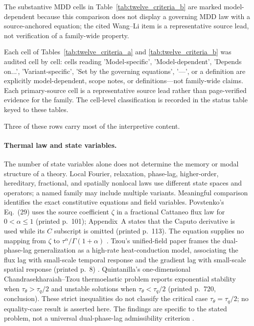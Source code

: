 The substantive MDD cells in Table~\ref{tab:twelve_criteria_b} are marked model-dependent because this comparison does not display a governing MDD law with a source-anchored equation; the cited Wang--Li item is a representative source lead, not verification of a family-wide property.

Each cell of Tables~\ref{tab:twelve_criteria_a} and \ref{tab:twelve_criteria_b} was audited cell by cell: cells reading 'Model-specific', 'Model-dependent', 'Depends on...', 'Variant-specific', 'Set by the governing equations', '---', or a definition are explicitly model-dependent, scope notes, or definitions---not family-wide claims. Each primary-source cell is a representative source lead rather than page-verified evidence for the family. The cell-level classification is recorded in the status table keyed to these tables.

Three of these rows carry most of the interpretive content.

\paragraph{Thermal law and state variables.}
The number of state variables alone does not determine the memory or modal structure of a theory. Local Fourier, relaxation, phase-lag, higher-order, hereditary, fractional, and spatially nonlocal laws use different state spaces and operators; a named family may include multiple variants. Meaningful comparison identifies the exact constitutive equations and field variables. Povstenko's Eq.~(29) uses the source coefficient $\zeta$ in a fractional Cattaneo flux law for $0<\alpha\leq1$ (printed p.~101); Appendix~A states that the Caputo derivative is used while its $C$ subscript is omitted (printed p.~113). The equation supplies no mapping from $\zeta$ to $\tau^\alpha/\Gamma(1+\alpha)$ \cite{Povstenko2011Cattaneo}. Tzou's unified-field paper frames the dual-phase-lag generalization as a high-rate heat-conduction model, associating the flux lag with small-scale temporal response and the gradient lag with small-scale spatial response (printed p.~8) \cite{Tzou1995}. Quintanilla's one-dimensional Chandrasekharaiah--Tzou thermoelastic problem reports exponential stability when $\tau_\theta>\tau_q/2$ and unstable solutions when $\tau_\theta<\tau_q/2$ (printed p.~720, conclusion). These strict inequalities do not classify the critical case $\tau_\theta=\tau_q/2$; no equality-case result is asserted here. The findings are specific to the stated problem, not a universal dual-phase-lag admissibility criterion \cite{Quintanilla2003DPL}.

